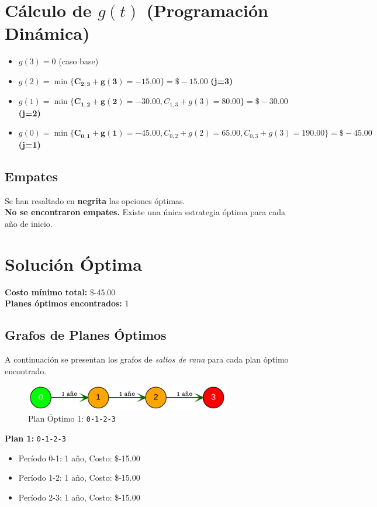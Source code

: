\documentclass[12pt]{article}
\begin{document}
\clearpage
\section*{Cálculo de $g(t)$ (Programación Dinámica)}
\begin{itemize}
\item $g(3) = 0$ (caso base)
\item $g(2) = \min\{ \mathbf{C_{2,3} + g(3) = -15.00}\} = \$-15.00$ \textbf{(j=3)}
\item $g(1) = \min\{ \mathbf{C_{1,2} + g(2) = -30.00}, C_{1,3} + g(3) = 80.00\} = \$-30.00$ \textbf{(j=2)}
\item $g(0) = \min\{ \mathbf{C_{0,1} + g(1) = -45.00}, C_{0,2} + g(2) = 65.00, C_{0,3} + g(3) = 190.00\} = \$-45.00$ \textbf{(j=1)}
\end{itemize}

\subsection*{Empates}
Se han resaltado en \textbf{negrita} las opciones óptimas.\\
\textbf{No se encontraron empates.} Existe una única estrategia óptima para cada año de inicio.\\
\clearpage
\section*{Solución Óptima}
\textbf{Costo mínimo total:} \$-45.00\\
\textbf{Planes óptimos encontrados:} 1
\subsection*{Grafos de Planes Óptimos}
A continuación se presentan los grafos de \emph{saltos de rana} para cada plan óptimo encontrado.

\begin{figure}[H]
\centering
\includegraphics[width=0.8\textwidth]{Reemplazo5x2_plan_1.png}
\caption{Plan Óptimo 1: \texttt{0-1-2-3}}
\label{fig:plan1}
\end{figure}

\textbf{Plan 1:} \texttt{0-1-2-3}
\begin{itemize}\small
\item Período 0-1: 1 año, Costo: \$-15.00
\item Período 1-2: 1 año, Costo: \$-15.00
\item Período 2-3: 1 año, Costo: \$-15.00
\end{itemize}
\end{document}
